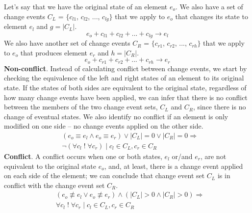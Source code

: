 Let's say that we have the original state of an element $e_{o}$. We also have a set of change events $C_{L}$ = $\{$$c_{l1}$, $c_{l2}$, ..., $c_{lg}$$\}$ that we apply to $e_{o}$ that changes its state to element $e_{l}$ and $g = |C_{L}|$. 
\begin{equation} \label{eq:ecbp_left}
e_{o} + c_{l1} + c_{l2} + ... + c_{lg} \rightarrow e_{l}
\end{equation} 
We also have another set of change events $C_{R}$ = $\{$$c_{r1}$, $c_{r2}$, ..., $c_{rh}$$\}$ that we apply to $e_{o}$ that produces element $e_{r}$ and $h = |C_{R}|$.
\begin{equation} \label{eq:ecbp_right}
e_{o} + c_{r1} + c_{r2} + ... + c_{rh} \rightarrow e_{r}
\end{equation} 
\textbf{Non-conflict}. Instead of calculating conflict between change events, we start by checking the equivalence of the left and right states of an element to its original state. If the states of both sides are equivalent to the original state, regardless of how many change events have been applied, we can infer that there is no conflict between the members of the two change event sets, $C_{L}$ and $C_{R}$, since there is no change of eventual states. We also identify no conflict if an element is only modified on one side -- no change events applied on the other side.
\begin{equation} \label{eq:ecbp_nonconflict}
\begin{split}
& (e_{o} \equiv e_{l} \wedge e_{o} \equiv e_{r}) \vee |C_{L}| = 0 \vee |C_{R}| = 0 \Rightarrow\\
& \neg(\forall c_{l} \;!\; \forall c_{r}) \;|\; c_{l} \in C_{L}, c_{r} \in C_{R}
\end{split}
\end{equation} 
\textbf{Conflict}. A conflict occurs when one or both states, $e_{l}$ or/and $e_{r}$, are not equivalent to the original state $e_{o}$, and, at least, there is a change event applied on each side of the element; we can conclude that change event set $C_{L}$ is in conflict with the change event set $C_{R}$.
\begin{equation} \label{eq:ecbp_conflict}
\begin{split}
& (e_{o} \not\equiv e_{l} \vee e_{o} \not\equiv e_{r}) \wedge (|C_{L}| > 0 \wedge |C_{R}| > 0) \Rightarrow\\
& \forall c_{l} \;!\; \forall c_{r} \;|\; c_{l} \in C_{L}, c_{r} \in C_{R}
\end{split}
\end{equation} 
